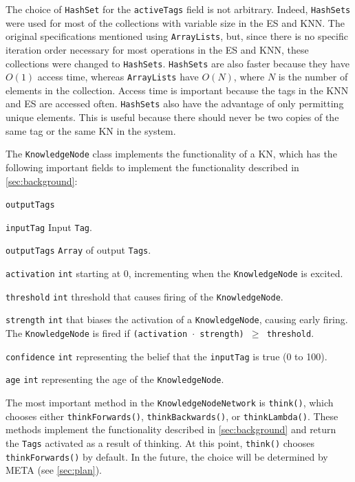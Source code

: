 \documentclass[titlepage,11pt]{article}
\newcommand{\ar}[1]{\autoref{#1}}
\newcommand{\code}[1]{\texttt{#1}}
\begin{document}
The choice of \code{HashSet} for the \code{activeTags} field is not arbitrary. Indeed, \code{HashSets} were used for most of the collections with variable size in the ES and KNN. The original specifications mentioned using \code{ArrayLists}, but, since there is no specific iteration order necessary for most operations in the ES and KNN, these collections were changed to \code{HashSets}. \code{HashSets} are also faster because they have $O(1)$ access time, whereas \code{ArrayLists} have $O(N)$, where $N$ is the number of elements in the collection. Access time is important because the tags in the KNN and ES are accessed often. \code{HashSets} also have the advantage of only permitting unique elements. This is useful because there should never be two copies of the same tag or the same KN in the system.

The \code{KnowledgeNode} class implements the functionality of a KN, which has the following important fields to implement the functionality described in \autoref{sec:background}:

\begin{labeling}{\code{outputTags}}
	\item[\code{inputTag}] Input \code{Tag}.
	\item[\code{outputTags}] \code{Array} of output \code{Tags}.
	\item[\code{activation}] \code{int} starting at 0, incrementing when the \code{KnowledgeNode} is excited.
	\item[\code{threshold}] \code{int} threshold that causes firing of the \code{KnowledgeNode}.
	\item[\code{strength}] \code{int} that biases the activation of a \code{KnowledgeNode}, causing early firing. The \code{KnowledgeNode} is fired if \code{(activation $\cdot$ strength) $\geq$ threshold}.
	\item[\code{confidence}] \code{int} representing the belief that the \code{inputTag} is true (0 to 100).
	\item[\code{age}] \code{int} representing the age of the \code{KnowledgeNode}.
\end{labeling}

The most important method in the \code{KnowledgeNodeNetwork} is \code{think()}, which chooses either \code{thinkForwards()}, \code{thinkBackwards()}, or \code{thinkLambda()}. These methods implement the functionality described in \ar{sec:background} and return the \code{Tags} activated as a result of thinking. At this point, \code{think()} chooses \code{thinkForwards()} by default. In the future, the choice will be determined by META (see \autoref{sec:plan}).
\end{document}
